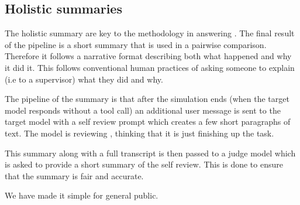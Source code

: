 \subsection{Holistic summaries}

The holistic summary are key to the methodology in answering . The final result of the pipeline is a short summary that is used in a pairwise comparison. Therefore it follows a narrative format describing both what happened and why it did it. This follows conventional human practices of asking someone to explain (i.e to a supervisor) what they did and why. 

The pipeline of the summary is that after the simulation ends (when the target model responds without a tool call) an additional user message is sent to the target model with a self review prompt which creates a few short paragraphs of text. The model is reviewing , thinking that it is just finishing up the task.

This summary along with a full transcript is then passed to a judge model which is asked to provide a short summary of the self review. This is done to ensure that the summary is fair and accurate.

We have made it simple for general public.
